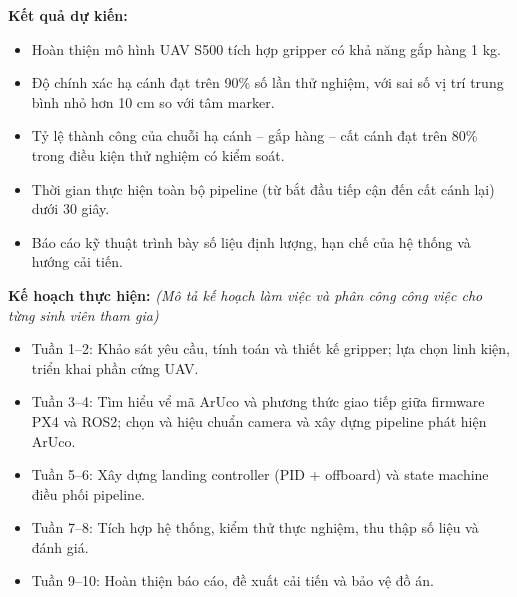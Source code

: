 \begin{mdframed}[style=decuongfield]
\vspace{1mm}
\textbf{Kết quả dự kiến:} 
\begin{itemize}
\item Hoàn thiện mô hình UAV S500 tích hợp gripper có khả năng gắp hàng 1 kg.
\item Độ chính xác hạ cánh đạt trên 90\% số lần thử nghiệm, với sai số vị trí trung bình nhỏ hơn 10 cm so với tâm marker.
\item Tỷ lệ thành công của chuỗi hạ cánh – gắp hàng – cất cánh đạt trên 80\% trong điều kiện thử nghiệm có kiểm soát.
\item Thời gian thực hiện toàn bộ pipeline (từ bắt đầu tiếp cận đến cất cánh lại) dưới 30 giây.
\item Báo cáo kỹ thuật trình bày số liệu định lượng, hạn chế của hệ thống và hướng cải tiến.
\end{itemize}
\par\vspace{-2mm}
\noindent\makebox[\linewidth][l]{\hspace*{-2.5mm}\rule{\dimexpr\linewidth+5mm\relax}{0.4pt}}\par


\vspace{1mm}
\textbf{Kế hoạch thực hiện:} \textit{(Mô tả kế hoạch làm việc và phân công công việc cho từng sinh viên tham gia)}
\begin{itemize}
\item Tuần 1--2: Khảo sát yêu cầu, tính toán và thiết kế gripper; lựa chọn linh kiện, triển khai phần cứng UAV.
\item Tuần 3--4: Tìm hiểu vể mã ArUco và phương thức giao tiếp giữa firmware PX4 và ROS2; chọn và hiệu chuẩn camera và xây dựng pipeline phát hiện ArUco.
\item Tuần 5--6: Xây dựng landing controller (PID + offboard) và state machine điều phối pipeline.
\item Tuần 7--8: Tích hợp hệ thống, kiểm thử thực nghiệm, thu thập số liệu và đánh giá.
\item Tuần 9--10: Hoàn thiện báo cáo, đề xuất cải tiến và bảo vệ đồ án.
\end{itemize}
\par\vspace{-2mm}
\noindent\makebox[\linewidth][l]{\hspace*{-2.5mm}\rule{\dimexpr\linewidth+5mm\relax}{0.4pt}}\par


\end{mdframed}
